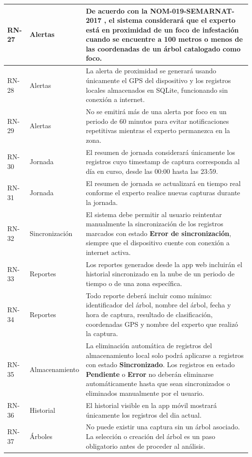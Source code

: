 \begin{longtable}{|>{\centering\arraybackslash}m{1.8cm}|>{\centering\arraybackslash}m{2.5cm}|m{9.5cm}|}
\hline
RN-27 & Alertas & De acuerdo con la NOM-019-SEMARNAT-2017 \cite{nom019_semarnat_2017}, el sistema considerará que el experto está en proximidad de un foco de infestación cuando se encuentre a 100 metros o menos de las coordenadas de un árbol catalogado como foco. \\
\hline
RN-28 & Alertas & La alerta de proximidad se generará usando únicamente el GPS del dispositivo y los registros locales almacenados en SQLite, funcionando sin conexión a internet. \\
\hline
RN-29 & Alertas & No se emitirá más de una alerta por foco en un periodo de 60 minutos para evitar notificaciones repetitivas mientras el experto permanezca en la zona. \\
\hline
RN-30 & Jornada & El resumen de jornada considerará únicamente los registros cuyo timestamp de captura corresponda al día en curso, desde las 00:00 hasta las 23:59. \\
\hline
RN-31 & Jornada & El resumen de jornada se actualizará en tiempo real conforme el experto realice nuevas capturas durante la jornada. \\
\hline
RN-32 & Sincronización & El sistema debe permitir al usuario reintentar manualmente la sincronización de los registros marcados con estado \textbf{Error de sincronización}, siempre que el dispositivo cuente con conexión a internet activa. \\
\hline
RN-33 & Reportes & Los reportes generados desde la app web incluirán el historial sincronizado en la nube de un periodo de tiempo o de una zona específica. \\
\hline
RN-34 & Reportes & Todo reporte deberá incluir como mínimo: identificador del árbol, nombre del árbol, fecha y hora de captura, resultado de clasificación, coordenadas GPS y nombre del experto que realizó la captura. \\
\hline
RN-35 & Almacenamiento & La eliminación automática de registros del almacenamiento local solo podrá aplicarse a registros con estado \textbf{Sincronizado}. Los registros en estado \textbf{Pendiente} o \textbf{Error} no deberán eliminarse automáticamente hasta que sean sincronizados o eliminados manualmente por el usuario. \\
\hline
RN-36 & Historial & El historial visible en la app móvil mostrará únicamente los registros del dia actual. \\
\hline
RN-37 & Árboles & No puede existir una captura sin un árbol asociado. La selección o creación del árbol es un paso obligatorio antes de proceder al análisis. \\

\end{longtable}

